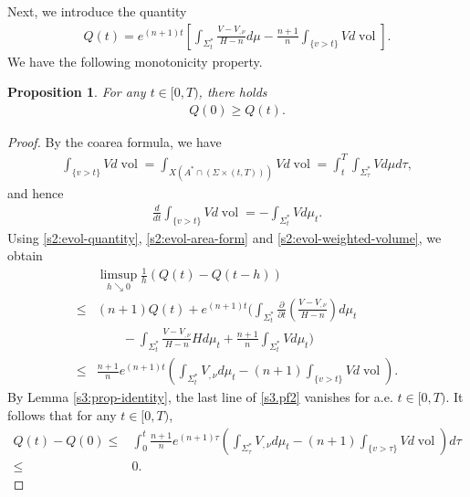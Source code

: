 \documentclass[11pt,reqno]{amsart}
\newtheorem{prop}[thm]{Proposition}
\theoremstyle{definition}
\theoremstyle{remark}
\numberwithin{equation}{section}
\renewcommand{\(}{\left(}
\renewcommand{\)}{\right)}
\renewcommand{\~}{\widetilde}
\renewcommand{\-}{\overline}
\newcommand{\vol}{\operatorname{vol}}
\begin{document}
Next, we introduce the quantity
\begin{align}\label{s3:def-Q(t)}
Q(t)=e^{(n+1)t}\left[\int_{\Sigma_t^\ast}\frac{V-V_{,\nu}}{H-n}d\mu-\frac{n+1}{n}\int_{\{v>t\}} V d\vol\right].
\end{align}
We have the following monotonicity property.
\begin{prop}\label{s3:monotonicity}
	For any $t\in [0,T)$, there holds
	\begin{align*}
	Q(0)\geq Q(t).
	\end{align*}
\end{prop}
\begin{proof}
	By the coarea formula, we have
	\begin{align*}
	\int_{\{v>t\}} V d\vol=\int_{X(A^\ast \cap (\Sigma \times (t,T)))} V d\vol=\int_t^{T} \int_{\Sigma_\tau^\ast} V d\mu d\tau,
	\end{align*}
	and hence
	\begin{align}\label{s2:evol-weighted-volume}
	\frac{d}{dt}\int_{\{v>t\}} V d\vol=-\int_{\Sigma_t^\ast} V d\mu_t.
	\end{align}
	Using \eqref{s2:evol-quantity}, \eqref{s2:evol-area-form} and \eqref{s2:evol-weighted-volume}, we obtain
	\begin{align}\label{s3.pf2}
	&\limsup_{h \searrow 0}\frac{1}{h}\(Q(t)-Q(t-h)\)\nonumber\\
	\leq &(n+1)Q(t)+e^{(n+1)t}\Bigg(\int_{\Sigma_t^\ast}\frac{\partial}{\partial t}\(\frac{V-V_{,\nu}}{H-n}\)d\mu_t\nonumber\\
&\qquad -\int_{\Sigma_t^\ast}\frac{V-V_{,\nu}}{H-n}Hd\mu_t+\frac{n+1}{n}\int_{\Sigma_t^\ast} V d\mu_t\Bigg)\nonumber\\
	\leq &\frac{n+1}{n}e^{(n+1)t}\left(\int_{\Sigma_t^\ast}V_{,\nu}d\mu_t-(n+1)\int_{\{v>t\}}Vd\vol\right).
	\end{align}
	By Lemma \ref{s3:prop-identity}, the last line of \eqref{s3.pf2} vanishes for a.e. $t\in [0,T)$. It follows that for any $t\in [0,T)$,
\begin{align*}
  Q(t)-Q(0)\leq &\int_0^t\frac{n+1}{n}e^{(n+1)\tau}\left(\int_{\Sigma_\tau^\ast}V_{,\nu}d\mu_t-(n+1)\int_{\{v>\tau\}}Vd\vol\right)d\tau\\
  \leq &0.
\end{align*}
\end{proof}
\end{document}
